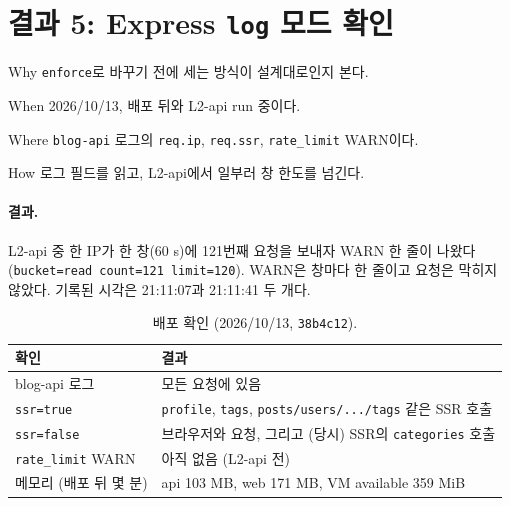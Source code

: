 \section{결과 5: Express \texttt{log} 모드 확인}\label{sec:07-result-logmode}

\begin{inbrief}
  \item[Why] \texttt{enforce}로 바꾸기 전에 세는 방식이 설계대로인지 본다.
  \item[When] 2026/10/13, 배포  뒤와 L2-api run 중이다.
  \item[Where] \texttt{blog-api} 로그의 \texttt{req.ip}, \texttt{req.ssr}, \texttt{rate\_limit} WARN이다.
  \item[How] 로그 필드를 읽고, L2-api에서 일부러 창 한도를 넘긴다.
\end{inbrief}

\paragraph{결과.}
L2-api 중 한 IP가 한 창(60 s)에 121번째 요청을 보내자 WARN 한 줄이 나왔다 (\texttt{bucket=read count=121 limit=120}).
WARN은 창마다 한 줄이고 요청은 막히지 않았다.
기록된 시각은 21:11:07과 21:11:41 두 개다.

\begin{table}[H]
  \caption{배포 확인 (2026/10/13, \texttt{38b4c12}).}\label{tab:07-logmode}
  \small
  \begin{tabularx}{\linewidth}{L{5cm} Y}
    \toprule
    확인 & 결과 \\
    \midrule
    blog-api 로그  & 모든 요청에 있음 \\
    \midrule
    \texttt{ssr=true} & \texttt{profile}, \texttt{tags}, \texttt{posts/users/.../tags} 같은 SSR 호출 \\
    \midrule
    \texttt{ssr=false} & 브라우저와  요청, 그리고 (당시) SSR의 \texttt{categories} 호출 \\
    \midrule
    \texttt{rate\_limit} WARN & 아직 없음 (L2-api 전) \\
    \midrule
    메모리 (배포 뒤 몇 분) & api 103 MB, web 171 MB, VM available 359 MiB \\
    \bottomrule
  \end{tabularx}
\end{table}

